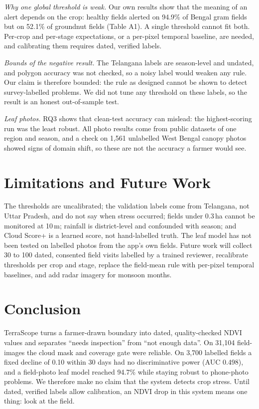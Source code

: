 \documentclass[conference]{IEEEtran}
\begin{document}
\textit{Why one global threshold is weak.} Our own results show that the meaning of an alert depends on the crop: healthy fields alerted on 94.9\% of Bengal gram fields but on 52.1\% of groundnut fields (Table A1). A single threshold cannot fit both. Per-crop and per-stage expectations, or a per-pixel temporal baseline, are needed, and calibrating them requires dated, verified labels.

\textit{Bounds of the negative result.} The Telangana labels are season-level and undated, and polygon accuracy was not checked, so a noisy label would weaken any rule. Our claim is therefore bounded: the rule as designed cannot be shown to detect survey-labelled problems. We did not tune any threshold on these labels, so the result is an honest out-of-sample test.

\textit{Leaf photos.} RQ3 shows that clean-test accuracy can mislead: the highest-scoring run was the least robust. All photo results come from public datasets of one region and season, and a check on 1,561 unlabelled West Bengal canopy photos showed signs of domain shift, so these are not the accuracy a farmer would see.

\section{Limitations and Future Work}
The thresholds are uncalibrated; the validation labels come from Telangana, not Uttar Pradesh, and do not say when stress occurred; fields under 0.3\,ha cannot be monitored at 10\,m; rainfall is district-level and confounded with season; and Cloud Score+ is a learned score, not hand-labelled truth. The leaf model has not been tested on labelled photos from the app's own fields. Future work will collect 30 to 100 dated, consented field visits labelled by a trained reviewer, recalibrate thresholds per crop and stage, replace the field-mean rule with per-pixel temporal baselines, and add radar imagery for monsoon months.

\section{Conclusion}
TerraScope turns a farmer-drawn boundary into dated, quality-checked NDVI values and separates ``needs inspection'' from ``not enough data''. On 31,104 field-images the cloud mask and coverage gate were reliable. On 3,700 labelled fields a fixed decline of 0.10 within 30 days had no discriminative power (AUC 0.498), and a field-photo leaf model reached 94.7\% while staying robust to phone-photo problems. We therefore make no claim that the system detects crop stress. Until dated, verified labels allow calibration, an NDVI drop in this system means one thing: look at the field.
\end{document}
